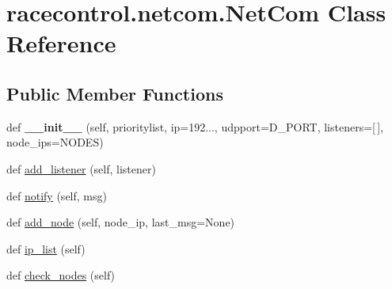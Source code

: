 \hypertarget{classracecontrol_1_1netcom_1_1NetCom}{}\section{racecontrol.\+netcom.\+Net\+Com Class Reference}
\label{classracecontrol_1_1netcom_1_1NetCom}
\subsection*{Public Member Functions}
\begin{DoxyCompactItemize}
\item 
def {\bfseries \+\_\+\+\_\+init\+\_\+\+\_\+} (self, prioritylist, ip=\textquotesingle{}192...\textquotesingle{}, udpport=D\+\_\+\+P\+O\+RT, listeners=\mbox{[}$\,$\mbox{]}, node\+\_\+ips=N\+O\+D\+ES)\hypertarget{classracecontrol_1_1netcom_1_1NetCom_a3decf896d9d62b9a3fd06dffef2b3fe5}{}\label{classracecontrol_1_1netcom_1_1NetCom_a3decf896d9d62b9a3fd06dffef2b3fe5}

\item 
def \hyperlink{classracecontrol_1_1netcom_1_1NetCom_a7b49efeb5e60231f5448f8650d84652c}{add\+\_\+listener} (self, listener)
\item 
def \hyperlink{classracecontrol_1_1netcom_1_1NetCom_abf3164ecfd214947921948b42d5a446e}{notify} (self, msg)
\item 
def \hyperlink{classracecontrol_1_1netcom_1_1NetCom_afa43456c9903324444b3d010376891f1}{add\+\_\+node} (self, node\+\_\+ip, last\+\_\+msg=None)
\item 
def \hyperlink{classracecontrol_1_1netcom_1_1NetCom_ae27f1bce1e6242c29b6e794019b9a67e}{ip\+\_\+list} (self)
\item 
def \hyperlink{classracecontrol_1_1netcom_1_1NetCom_aaf323cd72e9b4d5724b0268c54078894}{check\+\_\+nodes} (self)
\end{DoxyCompactItemize}
